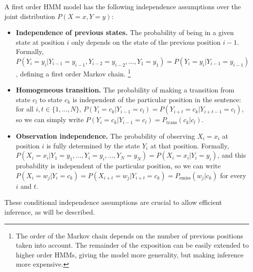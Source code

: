 A first order HMM model has the following independence assumptions over the joint distribution $P(X=x,Y=y)$:
\begin{itemize}
  \item \textbf{Independence of previous states.} The probability of
    being in a given state at position $i$ only depends on
    the state of the previous position $i-1$. Formally, 
    $P (Y_i = y_i | Y_{i-1} = y_{i-1}, Y_{i-2} = y_{i-2}, \ldots, Y_1 = y_1) = P (Y_i = y_i | Y_{i-1} = y_{i-1})$, 
    defining a first order Markov chain.%
    \footnote{The order of the Markov chain depends on the number of previous positions taken into account. 
    The remainder of the exposition can be easily extended to higher order HMMs, giving the model more generality, 
    but making inference more expensive.}
  \item \textbf{Homogeneous transition.} The probability of
    making a transition from state $c_l$ to state $c_k$ is independent of
    the particular position in the sentence: for all $i,t \in \{1,\ldots,N\}$,
    $P (Y_i = c_k | Y_{i-1} = c_l) =  P (Y_{i+t} = c_k | Y_{i+t-1} = c_l)$, so we can simply write 
    $P (Y_i = c_k | Y_{i-1} = c_l) = P_{\mathrm{trans}}(c_k|c_l)$.
  \item \textbf{Observation independence.}  The probability of
    observing $X_i = x_i$ at position $i$ is fully determined by the state $Y_i$
    at that position. Formally, $P (X_i = x_i | Y_1=y_1, \ldots, Y_i=y_i, \ldots, Y_N=y_N) = P(X_i = x_i | Y_i = y_i)$, and this probability is independent of the
    particular position, so we can write  $P(X_i = w_j | Y_i = c_k) = P(X_{i+t} = w_j | Y_{i+t} = c_k) = P_{\mathrm{emiss}}(w_j|c_k)$ for every $i$ and $t$.
\end{itemize}
These conditional independence assumptions are crucial to allow
efficient inference, as will be described.

